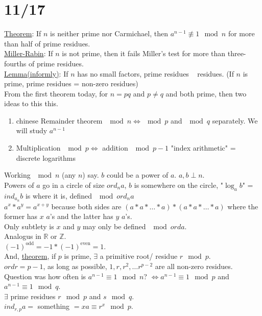 \documentclass[13pt]{article}
\begin{document}
\section*{11/17}
	\underline{Theorem}: If $n$ is neither prime nor Carmichael, then $a^{n-1} 
	\not\equiv 1 \mod n$ for more than half of prime residues.\\
	\underline{Miller-Rabin}: If $n$ is not prime, then it fails Miller's test 
	for more than three-fourths of prime residues.\\
	\underline{Lemma(informly)}: If $n$ has no small factors, prime residues
	~ residues. (If $n$ is prime, prime residues = non-zero residues)\\
	From the first theorem today, for $n = pq$ and $p \not= q$ and both prime,
	then two ideas to this this.
	\begin{enumerate}
		\item chinese Remainder theorem $\mod n \Leftrightarrow \mod p$ and
		$\mod q$ separately. We will study $a^{n-1}$
		\item Multiplication $\mod p \Leftrightarrow$ addition $\mod p -1$
		"index arithmetic" = discrete logarithms
	\end{enumerate}
	Working $\mod n$ (any $n$) say. $b$ could be a power of $a$. $a,b \perp 
	n$.\\
	Powers of $a$ go in a circle of size $ord_na$, $b$ is somewhere on the
	circle, "$\log_ab$" = $ind_{a_n}b$ is where it is, defined $\mod ord_n a$\\
	$a^x * a^y = a^{x + y}$ because both sides are $(a * a * \ldots * a) *
	(a * a * \ldots * a)$ where the former has $x$ $a$'s and the latter
	has $y$ $a$'s. \\
	Only subtlety is $x$ and $y$ may only be defined $\mod ord a$.\\
	Analogus in $\mathbb{R}$ or $\mathbb{Z}$.\\
	$(-1)^{\text{odd}} = -1 * (-1)^{\text{even}} = 1$.\\
	And, \underline{theorem}, if $p$ is prime, $\exists$ a primitive root/
	residue $r \mod p$.\\
	$ord r = p - 1$, as long as possible, $1, r, r^2, \ldots r^{p-2}$ are
	all non-zero residues.\\
	Question was how often is $a^{n-1} \equiv 1 \mod n$? $\Leftrightarrow
	a^{n - 1} \equiv 1 \mod p$ and $a^{n-1} \equiv 1 \mod q$.\\
	$\exists$ prime residues $r \mod p$ and $s \mod q$.\\
	$ind_{r,p}a = $ something $ = xa \equiv r^x \mod p$.\\
\end{document}
